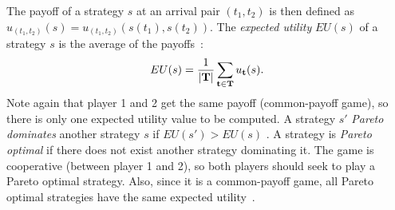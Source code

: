 
The payoff of a strategy $s$ at an arrival pair $(t_1,t_2)$ is then defined as $u_{(t_1,t_2)}(s) = u_{(t_1,t_2)} (s(t_1),s(t_2))$.  
The \emph{expected utility} $EU(s)$ of a strategy $s$ is the average of the payoffs~\cite{shoham2008multiagent}:
\[
 EU(s) = \frac{1}{|  {\bf T} |} \sum_{{\bf t} \in \bf T} u_\mathbf{t}(s). %
\]
Note again that player 1 and 2 get the same payoff (common-payoff game), so there is only one expected utility value to be computed. A strategy $s'$ \emph{Pareto dominates} another strategy $s$ if $EU(s') > EU(s)$ \cite{shoham2008multiagent}.
A strategy is \emph{Pareto optimal} if there does not exist another strategy dominating it. %
The game is cooperative (between player 1 and 2), so both players should seek to play a Pareto optimal strategy. Also, since it is a common-payoff game, all Pareto optimal strategies have the same expected utility~\cite{shoham2008multiagent}. 

